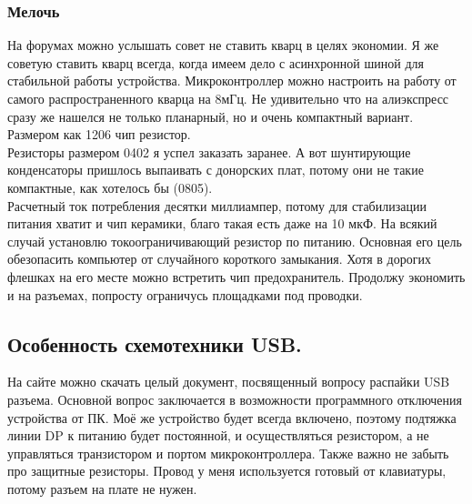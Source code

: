 \documentclass[12pt,a4paper]{article}
\begin{document}
\subsubsection{Мелочь}
    На форумах можно услышать совет не ставить кварц в целях экономии. Я же
    советую ставить кварц всегда, когда имеем дело с асинхронной шиной для
    стабильной работы устройства. Микроконтроллер можно настроить на работу от
    самого распространенного кварца на 8мГц. Не удивительно что на алиэкспресс
    сразу же нашелся не только планарный, но и очень компактный вариант.
    Размером как 1206 чип резистор. \\
    Резисторы размером 0402 я успел заказать заранее. А вот шунтирующие
    конденсаторы пришлось выпаивать с донорских плат, потому они не такие
    компактные, как хотелось бы (0805). \\
    Расчетный ток потребления десятки миллиампер, потому для стабилизации
    питания хватит и чип керамики, благо такая есть даже на 10 мкФ.
    На всякий случай установлю токоограничивающий резистор по питанию.
    Основная его цель обезопасить компьютер от случайного короткого замыкания.
    Хотя в дорогих флешках на его месте можно встретить чип предохранитель.
    Продолжу экономить и на разъемах, попросту ограничусь площадками под
    проводки.

\subsection{Особенность схемотехники USB.}
    На сайте можно скачать целый документ, посвященный вопросу распайки USB
    разъема. Основной вопрос заключается в возможности программного отключения
    устройства от ПК. Моё же устройство будет всегда включено, поэтому
    подтяжка линии DP к питанию будет постоянной, и осуществляться резистором,
    а не управляться транзистором и портом микроконтроллера.
    Также важно не забыть про защитные резисторы. Провод у меня используется
    готовый от клавиатуры, потому разъем на плате не нужен.
\end{document}
